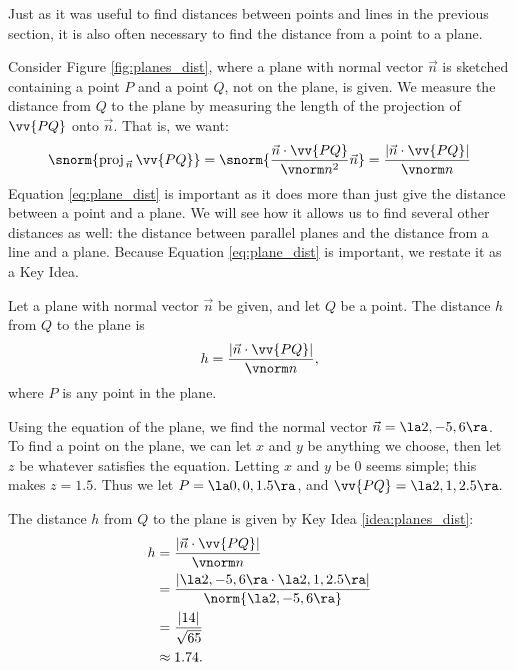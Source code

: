 Just as it was useful to find distances between points and lines in the previous section, it is also often necessary to find the distance from a point to a plane. 

Consider Figure \ref{fig:planes_dist}, where a plane with normal vector $\vec n$ is sketched containing a point $P$ and a point $Q$, not on the plane, is given. We measure the distance from $Q$ to the plane by measuring the length of the projection of $\vv{PQ}$ onto $\vec n$. That is, we want:
\begin{equation}\snorm{\text{proj}_{\,\vec n}\,{\vv{PQ}}} = \snorm{\frac{\vec n\cdot \vv{PQ}}{\vnorm n^2}\vec n} = \frac{|\vec n\cdot \vv{PQ}|}{\vnorm n}\label{eq:plane_dist}
\end{equation}
Equation \eqref{eq:plane_dist} is important as it does more than just give the distance between a point and a plane. We will see how it allows us to find several other distances as well: the distance between parallel planes and the distance from a line and a plane. Because Equation \eqref{eq:plane_dist} is important, we restate it as a Key Idea.

{Let a plane with normal vector $\vec n$ be given, and let $Q$ be a point. The distance $h$ from $Q$ to the plane is 
$$h = \frac{|\vec n\cdot \vv{PQ}|}{\vnorm n},$$
where $P$ is any point in the plane.
}

{Using the equation of the plane, we find the normal vector $\vec n = \la 2,-5,6\ra$. To find a point on the plane, we can let $x$ and $y$ be anything we choose, then let $z$ be whatever satisfies the equation. Letting $x$ and $y$ be 0 seems simple; this makes $z = 1.5$. Thus we let $P = \la 0,0,1.5\ra$, and $\vv{PQ} = \la 2,1,2.5\ra.$

The distance $h$ from $Q$ to the plane is given by Key Idea \ref{idea:planes_dist}:
\begin{align*}
h &= \frac{|\vec n\cdot \vv{PQ}|}{\vnorm n} \\
  &= \frac{|\la 2,-5,6\ra \cdot \la 2,1,2.5\ra|}{\norm{\la 2,-5,6\ra}} \\
	&= \frac{ |14|}{\sqrt{65}} \\
	&\approx 1.74.
\end{align*}}

